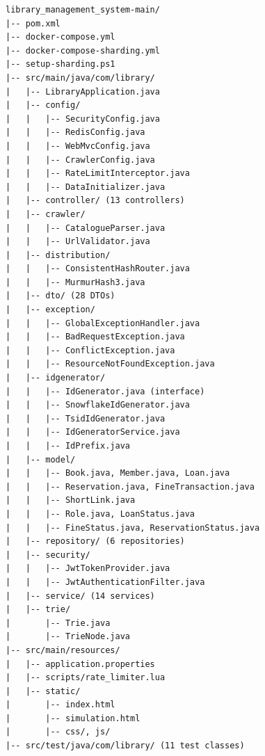 \documentclass[12pt,a4paper]{report}
\begin{document}
\begin{lstlisting}[style=PropsStyle, caption={Complete Project Directory Tree}]
library_management_system-main/
|-- pom.xml
|-- docker-compose.yml
|-- docker-compose-sharding.yml
|-- setup-sharding.ps1
|-- src/main/java/com/library/
|   |-- LibraryApplication.java
|   |-- config/
|   |   |-- SecurityConfig.java
|   |   |-- RedisConfig.java
|   |   |-- WebMvcConfig.java
|   |   |-- CrawlerConfig.java
|   |   |-- RateLimitInterceptor.java
|   |   |-- DataInitializer.java
|   |-- controller/ (13 controllers)
|   |-- crawler/
|   |   |-- CatalogueParser.java
|   |   |-- UrlValidator.java
|   |-- distribution/
|   |   |-- ConsistentHashRouter.java
|   |   |-- MurmurHash3.java
|   |-- dto/ (28 DTOs)
|   |-- exception/
|   |   |-- GlobalExceptionHandler.java
|   |   |-- BadRequestException.java
|   |   |-- ConflictException.java
|   |   |-- ResourceNotFoundException.java
|   |-- idgenerator/
|   |   |-- IdGenerator.java (interface)
|   |   |-- SnowflakeIdGenerator.java
|   |   |-- TsidIdGenerator.java
|   |   |-- IdGeneratorService.java
|   |   |-- IdPrefix.java
|   |-- model/
|   |   |-- Book.java, Member.java, Loan.java
|   |   |-- Reservation.java, FineTransaction.java
|   |   |-- ShortLink.java
|   |   |-- Role.java, LoanStatus.java
|   |   |-- FineStatus.java, ReservationStatus.java
|   |-- repository/ (6 repositories)
|   |-- security/
|   |   |-- JwtTokenProvider.java
|   |   |-- JwtAuthenticationFilter.java
|   |-- service/ (14 services)
|   |-- trie/
|       |-- Trie.java
|       |-- TrieNode.java
|-- src/main/resources/
|   |-- application.properties
|   |-- scripts/rate_limiter.lua
|   |-- static/
|       |-- index.html
|       |-- simulation.html
|       |-- css/, js/
|-- src/test/java/com/library/ (11 test classes)
\end{lstlisting}
\end{document}
